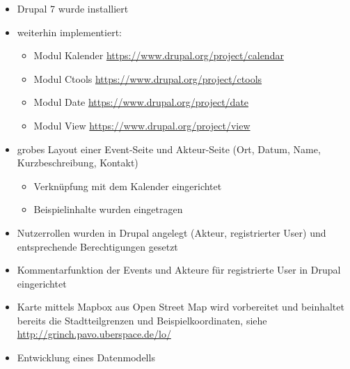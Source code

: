 \documentclass{swp}
\begin{document}
\\\\\\\\\\

\begin{itemize} 
\item Drupal 7 wurde installiert
\item weiterhin implementiert:
\begin{itemize} 
\item Modul \glqq Kalender\grqq{} \url{https://www.drupal.org/project/calendar}
\item Modul \glqq Ctools\grqq{} \url{https://www.drupal.org/project/ctools}
\item Modul \glqq Date\grqq{} \url{https://www.drupal.org/project/date}
\item Modul \glqq View\grqq{} \url{https://www.drupal.org/project/view}
\end{itemize}
\item grobes Layout einer Event-Seite und Akteur-Seite (Ort, Datum, Name, Kurzbeschreibung, Kontakt)
\begin{itemize}
\item Verkn\"upfung mit dem Kalender eingerichtet
\item Beispielinhalte wurden eingetragen 
\end{itemize}
\item Nutzerrollen wurden in Drupal angelegt (Akteur, registrierter User) und entsprechende Berechtigungen gesetzt
\item Kommentarfunktion der Events und Akteure f\"ur registrierte User in Drupal eingerichtet
\item Karte mittels Mapbox aus Open Street Map wird vorbereitet und beinhaltet bereits die Stadtteilgrenzen und Beispielkoordinaten, siehe \url{http://grinch.pavo.uberspace.de/lo/}
\item Entwicklung eines Datenmodells\\\\
\end{itemize}
\end{document}
